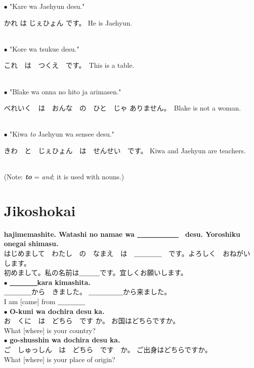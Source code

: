 \documentclass[11pt]{article} %
\newcommand{\ee}{\vspace{.10cm}\\} %
\begin{document}
$\bullet$ "Kare wa Jaehyun desu."\\ \begin{CJK}{UTF8}{min} かれ は じぇひょん です。 He is Jaehyun.\end{CJK}\\
$\bullet$ "Kore wa tsukue desu."\\ \begin{CJK}{UTF8}{min}これ　は　つくえ　です。　This is a table.\end{CJK}\\
$\bullet$ "Blake wa onna no hito ja arimasen."\\ \begin{CJK}{UTF8}{min}べれいく　は　おんな　の　ひと　じゃ ありません。　Blake is not a woman.\end{CJK}\\
$\bullet$ "Kiwa \textit{to} Jaehyun wa sensee desu."\\ \begin{CJK}{UTF8}{min}きわ　と　じぇひょん　は　せんせい　です。 Kiwa and Jaehyun are teachers.\end{CJK}\\
(Note: \textbf{\textit{to}} = \textit{and}; it is used with nouns.)

\section{Jikoshokai}
\begin{CJK}{UTF8}{min}\textbf{hajimemashite. Watashi no namae wa ＿＿＿＿＿＿　desu. Yoroshiku onegai shimasu.}\\
はじめまして　わたし　の　なまえ　は　＿＿＿＿　です。よろしく　おねがい　します。\\
初めまして。私の名前は＿＿＿です。宜しくお願いします。\ee

$\bullet$ \textbf{＿＿＿＿kara kimashita.}\\
＿＿＿＿から　きました。 ＿＿＿＿＿から来ました。\\
I am [came] from ＿＿＿＿\\
$\bullet$ \textbf{O-kuni wa dochira desu ka.} \\
お　くに　は　どちら　です か。 お国はどちらですか。\\
What [where] is your country? \\
$\bullet$ \textbf{go-shusshin wa dochira desu ka.} \\
ご　しゅっしん　は　どちら　です　か。 ご出身はどちらですか。\\
What [where] is your place of origin?\end{CJK}
\end{document}
